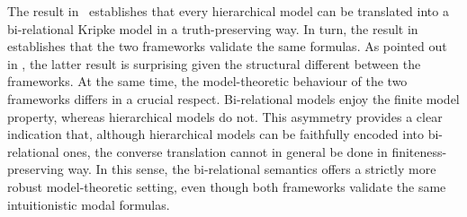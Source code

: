 
The result in~ establishes that every hierarchical model can be translated into a bi-relational Kripke model in a truth-preserving way. In turn, the result in  establishes that the two frameworks validate the same formulas. As pointed out in \cite{simpson1994}, the latter result is surprising given the structural different between the frameworks. At the same time, the model-theoretic behaviour of the two frameworks differs in a crucial respect. Bi-relational models enjoy the finite model property, whereas hierarchical models do not. This asymmetry provides a clear indication that, although hierarchical models can be faithfully encoded into bi-relational ones, the converse translation cannot in general be done in finiteness-preserving way. In this sense, the bi-relational semantics offers a strictly more robust model-theoretic setting, even though both frameworks validate the same intuitionistic modal formulas.
